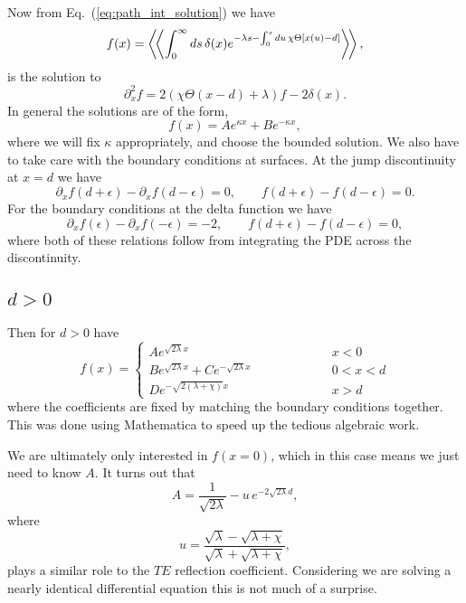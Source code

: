 Now from Eq.~(\ref{eq:path_int_solution}) we have 
\begin{equation}
  f(x) = \left\langle\!\left\langle  \int_0^\infty ds\,\delta(x) e^{-\lambda s-\int_0^s du\,\chi\Theta[x(u)-d]} \right\rangle\!\right\rangle,
\end{equation}
is the solution to 
\begin{equation}
\partial_x^2 f = 2(\chi\Theta(x-d)+\lambda)f - 2\delta(x).  
\end{equation}
In general the solutions are of the form, 
\begin{equation}
f(x) = A e^{\kappa x} + B e^{-\kappa x},
\end{equation}
where we will fix $\kappa$ appropriately, and choose the bounded solution.  We also have to take care with the boundary conditions at surfaces.  At the jump discontinuity at $x=d$ we have 
\begin{equation}
\partial_xf(d+\epsilon) - \partial_x f(d-\epsilon) = 0, \qquad f(d+\epsilon)-f(d-\epsilon) = 0.  
\end{equation}
For the boundary conditions at the delta function we have 
\begin{equation}
\partial_xf(\epsilon) -\partial_x f(-\epsilon) = -2 , \qquad f(d+\epsilon)-f(d-\epsilon) = 0,
\end{equation}
where both of these relations follow from integrating the PDE across the discontinuity.  
\subsection{$ d>0$}
Then for $d>0$ have 
\begin{equation}
f(x) =\left\{ 
\begin{array}{lcr}  A e^{\sqrt{2\lambda} x} & \hspace{2cm} & x<0\\
B e^{\sqrt{2\lambda}x} + Ce^{-\sqrt{2\lambda}x} & \hspace{2cm} & 0<x<d\\
D e^{-\sqrt{2(\lambda+\chi)}x} & \hspace{2cm} & x>d
\end{array}
\right.
\end{equation}
where the coefficients are fixed by matching the boundary conditions together.  This was done using Mathematica to speed up the tedious algebraic work.  

We are ultimately only interested in $f(x=0)$, which in this case means we just need to know $A$.  
It turns out that 
\begin{equation}
A = \frac{1}{\sqrt{2\lambda}} - u\,e^{-2\sqrt{2\lambda}d},\end{equation}
where
\begin{equation}
u = \frac{\sqrt{\lambda} -\sqrt{\lambda+\chi}}{\sqrt{\lambda} + \sqrt{\lambda+\chi}},
\end{equation}
plays a similar role to the $TE$ reflection coefficient.  Considering we are solving a nearly identical differential equation this is not much of a surprise.  

